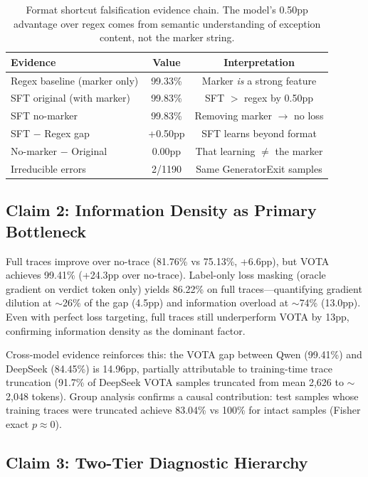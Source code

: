 \documentclass[11pt,a4paper]{article}
\begin{document}
\begin{table}[t]
\centering
\small
\begin{tabular}{lcc}
\toprule
\textbf{Evidence} & \textbf{Value} & \textbf{Interpretation} \\
\midrule
Regex baseline (marker only) & 99.33\% & Marker \emph{is} a strong feature \\
SFT original (with marker) & 99.83\% & SFT $>$ regex by 0.50pp \\
SFT no-marker & 99.83\% & Removing marker $\rightarrow$ no loss \\
SFT $-$ Regex gap & +0.50pp & SFT learns beyond format \\
No-marker $-$ Original & 0.00pp & That learning $\neq$ the marker \\
Irreducible errors & 2/1190 & Same GeneratorExit samples \\
\bottomrule
\end{tabular}
\caption{Format shortcut falsification evidence chain. The model's 0.50pp advantage over regex comes from semantic understanding of exception content, not the marker string.}
\label{tab:evidence_chain}
\end{table}

\subsection{Claim 2: Information Density as Primary Bottleneck}

Full traces improve over no-trace (81.76\% vs 75.13\%, +6.6pp), but VOTA achieves 99.41\% (+24.3pp over no-trace). Label-only loss masking (oracle gradient on verdict token only) yields 86.22\% on full traces---quantifying gradient dilution at $\sim$26\% of the gap (4.5pp) and information overload at $\sim$74\% (13.0pp). Even with perfect loss targeting, full traces still underperform VOTA by 13pp, confirming information density as the dominant factor.

Cross-model evidence reinforces this: the VOTA gap between Qwen (99.41\%) and DeepSeek (84.45\%) is 14.96pp, partially attributable to training-time trace truncation (91.7\% of DeepSeek VOTA samples truncated from mean 2,626 to $\sim$2,048 tokens). Group analysis confirms a causal contribution: test samples whose training traces were truncated achieve 83.04\% vs 100\% for intact samples (Fisher exact $p \approx 0$).

\subsection{Claim 3: Two-Tier Diagnostic Hierarchy}
\end{document}
